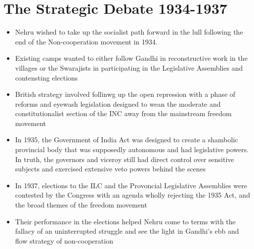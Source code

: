 \section{The Strategic Debate 1934-1937}
\begin{itemize}
    \item Nehru wished to take up the socialist path forward in the lull following the end of the Non-cooperation movement in 1934.
    \item Existing camps wanted to either follow Gandhi in reconstructive work in the villages or the Swarajists in participating in the Legislative Assemblies and contensting elections
    \item British strategy involved follinwg up the open repression with a phase of reforms and eyewash legislation designed to wean the moderate and constitutionalist section of the INC away from the mainstream freedom movement
    \item In 1935, the Government of India Act was designed to create a shambolic provincial body that was supposedly autonomous and had legislative powers. In truth, the governors and viceroy still had direct control over sensitive subjects and exercised extensive veto powers behind the scenes
    \item In 1937, elections to the ILC and the Provoncial Legislative Assemblies were contested by the Congress with an agenda wholly rejecting the 1935 Act, and the broad themes of the freedom movement
    \item Their performance in the elections helped Nehru come to terms with the fallacy of an uninterrupted struggle and see the light in Gandhi's ebb and flow strategy of non-cooperation
\end{itemize}

